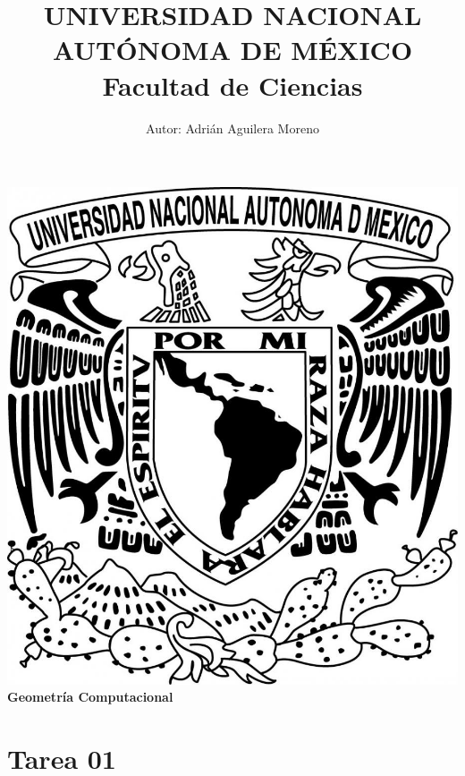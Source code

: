 \documentclass{article}
\begin{document}
\title{UNIVERSIDAD NACIONAL AUT\'ONOMA DE M\'EXICO\\ Facultad de Ciencias}
\author{Autor: Adri\'an Aguilera Moreno}
\date{}
\maketitle
\begin{center}
  \includegraphics[scale=0.20]{../Imagen/Portada.jpg}\\[0.4cm]
  \Large
  \bf{Geometría Computacional}
  \normalsize
\end{center}
\newpage
{}
\section*{\LARGE{Tarea 01}}

\newpage

\newline


\newpage

\newpage





\newpage

\newpage

\newpage

\end{document}
